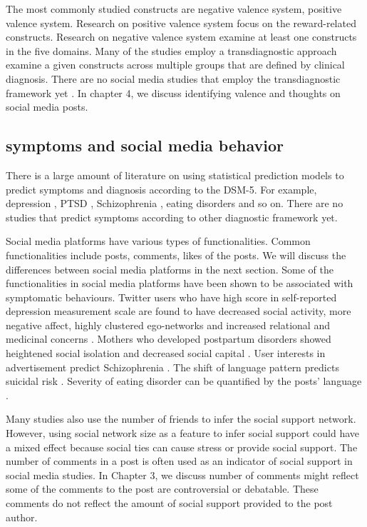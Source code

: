 The most commonly studied constructs are negative valence system, positive valence system. Research on positive valence system focus on the reward-related constructs. Research on negative valence system examine at least one constructs in the five domains. Many of the studies employ a transdiagnostic approach examine a given constructs across multiple groups that are defined by clinical diagnosis. There are no social media studies that employ the transdiagnostic framework yet \cite{carcone2017six}. In chapter 4, we discuss identifying valence and thoughts on social media posts.

\subsection{symptoms and social media behavior}
There is a large amount of literature on using statistical prediction models to predict symptoms and diagnosis according to the DSM-5. For example, depression \cite{murrieta_depression:_2018,de2013social,reece2017forecasting} , PTSD \cite{reece2017forecasting}, Schizophrenia \cite{saha2017characterizing}, eating disorders \cite{chancellor2016quantifying} and so on. There are no studies that predict symptoms according to other diagnostic framework yet.

Social media platforms have various types of functionalities. Common functionalities include posts, comments, likes of the posts. We will discuss the differences between social media platforms in the next section. Some of the functionalities in social media platforms have been shown to be associated with symptomatic behaviours. Twitter users who have high score in self-reported depression measurement scale are found to have decreased social activity, more negative affect, highly clustered ego-networks and increased relational and medicinal concerns \cite{de2013predicting}. Mothers who developed postpartum disorders showed heightened social isolation and decreased social capital \cite{de2014characterizing}. User interests in advertisement predict Schizophrenia \cite{saha2017characterizing}. The shift of language pattern predicts suicidal risk \cite{de2016discovering}. Severity of eating disorder can be quantified by the posts' language \cite{chancellor2016quantifying}. 

Many studies also use the number of friends to infer the social support network. However, using social network size as a feature to infer social support could have a mixed effect because social ties can cause stress or provide social support. The number of comments in a post is often used as an indicator of social support in social media studies. In Chapter 3, we discuss number of comments might reflect some of the comments to the post are controversial or debatable. These comments do not reflect the amount of social support provided to the post author.


